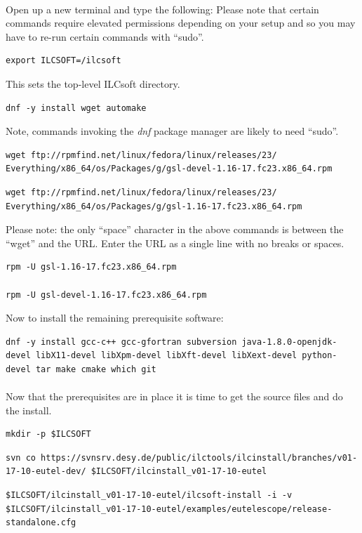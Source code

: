 \documentclass[11pt]{article}
\begin{document}
\paragraph{}
Open up a new terminal and type the following: Please note that certain commands require elevated permissions depending on your setup and so you may have to re-run certain commands with ``sudo''.
\begin{verbatim}
export ILCSOFT=/ilcsoft
\end{verbatim}
This sets the top-level ILCsoft directory.
\begin{verbatim}
dnf -y install wget automake
\end{verbatim}
Note, commands invoking the \textit{dnf} package manager are likely to need ``sudo''.
\begin{verbatim}
wget ftp://rpmfind.net/linux/fedora/linux/releases/23/
Everything/x86_64/os/Packages/g/gsl-devel-1.16-17.fc23.x86_64.rpm
\end{verbatim}
\begin{verbatim}
wget ftp://rpmfind.net/linux/fedora/linux/releases/23/
Everything/x86_64/os/Packages/g/gsl-1.16-17.fc23.x86_64.rpm
\end{verbatim}
Please note: the only ``space'' character in the above commands is between the ``wget'' and the URL. Enter the URL as a single line with no breaks or spaces. 
\begin{verbatim}
rpm -U gsl-1.16-17.fc23.x86_64.rpm

rpm -U gsl-devel-1.16-17.fc23.x86_64.rpm
\end{verbatim}
Now to install the remaining prerequisite software:
\begin{verbatim}
dnf -y install gcc-c++ gcc-gfortran subversion java-1.8.0-openjdk-devel libX11-devel libXpm-devel libXft-devel libXext-devel python-devel tar make cmake which git
\end{verbatim}
\paragraph{}
Now that the prerequisites are in place it is time to get the source files and do the install.
\begin{verbatim}
mkdir -p $ILCSOFT
\end{verbatim}
\begin{verbatim}
svn co https://svnsrv.desy.de/public/ilctools/ilcinstall/branches/v01-17-10-eutel-dev/ $ILCSOFT/ilcinstall_v01-17-10-eutel
\end{verbatim}
\begin{verbatim}
$ILCSOFT/ilcinstall_v01-17-10-eutel/ilcsoft-install -i -v $ILCSOFT/ilcinstall_v01-17-10-eutel/examples/eutelescope/release-standalone.cfg
\end{verbatim}
\end{document}
